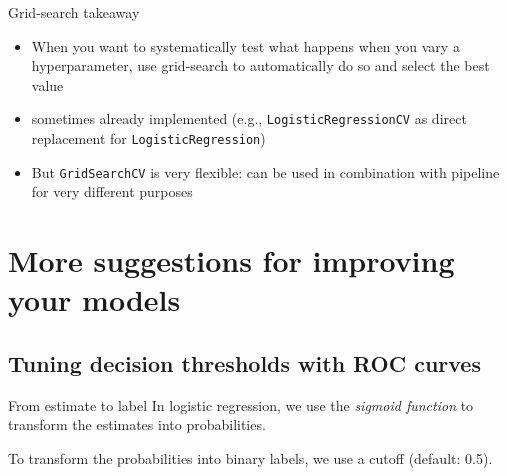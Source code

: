 \documentclass[compress]{beamer}
\begin{document}
\begin{frame}{Grid-search takeaway}
\begin{itemize}[<+->]
	\item When you want to systematically test what happens when you vary a hyperparameter, use grid-search to automatically do so and select the best value
	\item sometimes already implemented (e.g., \texttt{LogisticRegressionCV} as direct replacement for \texttt{LogisticRegression})
	\item But \texttt{GridSearchCV} is very flexible: can be used in combination with pipeline for very different purposes
\end{itemize}


\end{frame}











\section[More suggestions ]{More suggestions for improving your models}



\subsection{Tuning decision thresholds with ROC curves}

\begin{frame}{From estimate to label}
In logistic regression, we use the \textit{sigmoid function} to transform the estimates into probabilities.

To transform the probabilities into binary labels, we use a cutoff (default: 0.5).
\end{frame}
\end{document}
